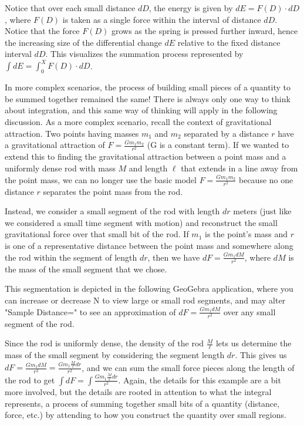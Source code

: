 \documentclass{ximera}
\begin{document}
\begin{center}
\end{center}

Notice that over each small distance $dD$, the energy is given by $dE=F(D)\cdot dD$, where $F(D)$ is taken as a single force within the interval of distance $dD$. Notice that the force $F(D)$ grows as the spring is pressed further inward, hence the increasing size of the differential change $dE$ relative to the fixed distance interval $dD$. This visualizes the summation process represented by $\int dE=\int_0^X F(D)\cdot dD$.

In more complex scenarios, the process of building small pieces of a quantity to be summed together remained the same! There is always only one way to think about integration, and this same way of thinking will apply in the following discussion. As a more complex scenario, recall the context of gravitational attraction. Two points having masses $m_1$ and $m_2$ separated by a distance $r$ have a gravitational attraction of $F=\frac{Gm_1m_2}{r^2}$ (G is a constant term). If we wanted to extend this to finding the gravitational attraction between a point mass and a uniformly dense rod with mass $M$ and length $\ell$ that extends in a line away from the point mass, we can no longer use the basic model $F=\frac{Gm_1m_2}{r^2}$ because no one distance $r$ separates the point mass from the rod.

Instead, we consider a small segment of the rod with length $dr$ meters (just like we considered a small time segment with motion) and reconstruct the small gravitational force over that small bit of the rod. If $m_1$ is the point's mass and $r$ is one of a representative distance between the point mass and somewhere along the rod within the segment of length $dr$, then we have $dF=\frac{Gm_1dM}{r^2}$, where $dM$ is the mass of the small segment that we chose.

This segmentation is depicted in the following GeoGebra application, where you can increase or decrease N to view large or small rod segments, and may alter "Sample Distance=" to see an approximation of $dF=\frac{Gm_1dM}{r^2}$ over any small segment of the rod.

\begin{center}
\end{center}

Since the rod is uniformly dense, the density of the rod $\frac{M}{\ell}$ lets us determine the mass of the small segment by considering the segment length $dr$. This gives us $dF=\frac{Gm_1dM}{r^2}=\frac{Gm_1\frac{M}{\ell}dr}{r^2}$, and we can sum the small force pieces along the length of the rod to get $\int dF=\int\frac{Gm_1\frac{M}{\ell}dr}{r^2}$. Again, the details for this example are a bit more involved, but the details are rooted in attention to what the integral represents, a process of summing together small bits of a quantity (distance, force, etc.) by attending to how you construct the quantity over small regions.
\end{document}
